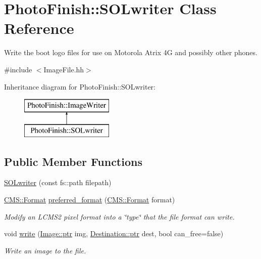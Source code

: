 \hypertarget{class_photo_finish_1_1_s_o_lwriter}{}\section{Photo\+Finish\+:\+:S\+O\+Lwriter Class Reference}
\label{class_photo_finish_1_1_s_o_lwriter}


Write the boot logo files for use on Motorola Atrix 4G and possibly other phones.  




{\ttfamily \#include $<$Image\+File.\+hh$>$}

Inheritance diagram for Photo\+Finish\+:\+:S\+O\+Lwriter\+:\begin{figure}[H]
\begin{center}
\leavevmode
\includegraphics[height=2.000000cm]{class_photo_finish_1_1_s_o_lwriter}
\end{center}
\end{figure}
\subsection*{Public Member Functions}
\begin{DoxyCompactItemize}
\item 
\hyperlink{class_photo_finish_1_1_s_o_lwriter_aac400059e73657e362495d15725f8b9f}{S\+O\+Lwriter} (const fs\+::path filepath)
\item 
\hyperlink{class_c_m_s_1_1_format}{C\+M\+S\+::\+Format} \hyperlink{class_photo_finish_1_1_s_o_lwriter_a5d3c9c3b3e289bc3cf5360b3bf2c2837}{preferred\+\_\+format} (\hyperlink{class_c_m_s_1_1_format}{C\+M\+S\+::\+Format} format)
\begin{DoxyCompactList}\small\item\em Modify an L\+C\+M\+S2 pixel format into a \char`\"{}type\char`\"{} that the file format can write. \end{DoxyCompactList}\item 
void \hyperlink{class_photo_finish_1_1_s_o_lwriter_a5e77af019b22c00ed97e42f531932677}{write} (\hyperlink{class_photo_finish_1_1_image_ab336203305ed3a1397d7245063353b5a}{Image\+::ptr} img, \hyperlink{class_photo_finish_1_1_destination_a0d282a905cd81c3f0e6d7233c9bc7774}{Destination\+::ptr} dest, bool can\+\_\+free=false)
\begin{DoxyCompactList}\small\item\em Write an image to the file. \end{DoxyCompactList}\end{DoxyCompactItemize}
